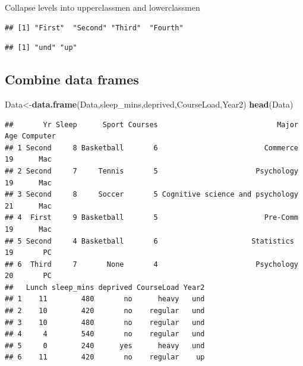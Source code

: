 \documentclass[
  openany]{book}
\newenvironment{Shaded}{\begin{snugshade}}{\end{snugshade}}
\newcommand{\FunctionTok}[1]{\textcolor[rgb]{0.13,0.29,0.53}{\textbf{#1}}}
\newcommand{\NormalTok}[1]{#1}
\newcommand{\OtherTok}[1]{\textcolor[rgb]{0.56,0.35,0.01}{#1}}
\newcommand{\SpecialCharTok}[1]{\textcolor[rgb]{0.81,0.36,0.00}{\textbf{#1}}}
\newcommand{\StringTok}[1]{\textcolor[rgb]{0.31,0.60,0.02}{#1}}
\begin{document}
Collapse levels
into upperclassmen and lowerclassmen

\begin{Shaded}
\end{Shaded}

\begin{verbatim}
## [1] "First"  "Second" "Third"  "Fourth"
\end{verbatim}

\begin{Shaded}
\end{Shaded}

\begin{verbatim}
## [1] "und" "up"
\end{verbatim}

\subsection{\texorpdfstring{\textbf{Combine data frames}}{Combine data frames}}\label{combine-data-frames}

\begin{Shaded}
\begin{Highlighting}[]
\NormalTok{Data}\OtherTok{\textless{}{-}}\FunctionTok{data.frame}\NormalTok{(Data,sleep\_mins,deprived,CourseLoad,Year2)}
\FunctionTok{head}\NormalTok{(Data)}
\end{Highlighting}
\end{Shaded}

\begin{verbatim}
##       Yr Sleep      Sport Courses                            Major Age Computer
## 1 Second     8 Basketball       6                         Commerce  19      Mac
## 2 Second     7     Tennis       5                       Psychology  19      Mac
## 3 Second     8     Soccer       5 Cognitive science and psychology  21      Mac
## 4  First     9 Basketball       5                         Pre-Comm  19      Mac
## 5 Second     4 Basketball       6                      Statistics   19       PC
## 6  Third     7       None       4                       Psychology  20       PC
##   Lunch sleep_mins deprived CourseLoad Year2
## 1    11        480       no      heavy   und
## 2    10        420       no    regular   und
## 3    10        480       no    regular   und
## 4     4        540       no    regular   und
## 5     0        240      yes      heavy   und
## 6    11        420       no    regular    up
\end{verbatim}
\end{document}
